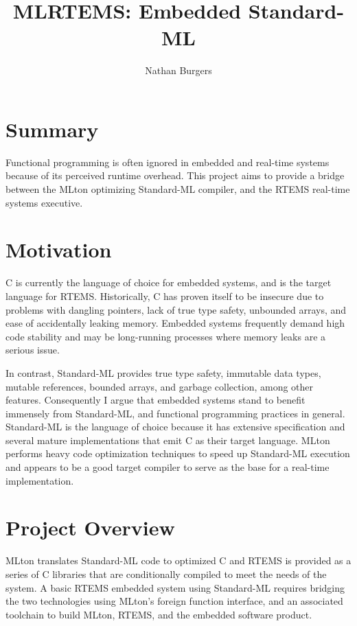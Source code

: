 \documentclass[12pt]{article}
\title{MLRTEMS: Embedded Standard-ML}
\author{Nathan Burgers}
\begin{document}
\maketitle

\section{Summary}
Functional programming is often ignored in embedded and real-time systems because of its perceived runtime overhead. This project aims to provide a bridge between the MLton optimizing Standard-ML compiler, and the RTEMS real-time systems executive.

\section{Motivation}
C is currently the language of choice for embedded systems, and is the target language for RTEMS. Historically, C has proven itself to be insecure due to problems with dangling pointers, lack of true type safety, unbounded arrays, and ease of accidentally leaking memory. Embedded systems frequently demand high code stability and may be long-running processes where memory leaks are a serious issue.

In contrast, Standard-ML provides true type safety, immutable data types, mutable references, bounded arrays, and garbage collection, among other features. Consequently I argue that embedded systems stand to benefit immensely from Standard-ML, and functional programming practices in general. Standard-ML is the language of choice because it has extensive specification and several mature implementations that emit C as their target language. MLton performs heavy code optimization techniques to speed up Standard-ML execution and appears to be a good target compiler to serve as the base for a real-time implementation.

\section{Project Overview}

MLton translates Standard-ML code to optimized C and RTEMS is provided as a series of C libraries that are conditionally compiled to meet the needs of the system. A basic RTEMS embedded system using Standard-ML requires bridging the two technologies using MLton's foreign function interface, and an associated toolchain to build MLton, RTEMS, and the embedded software product.
\end{document}
